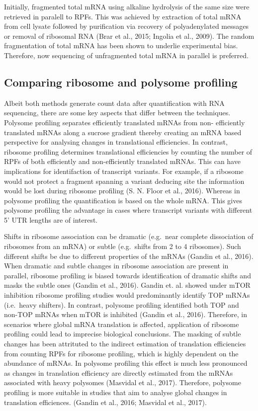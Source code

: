 \documentclass[12pt,openany]{book}
\begin{document}
Initially, fragmented total mRNA using alkaline hydrolysis of the same
size were retrieved in paralell to RPFs. This was achieved by extraction
of total mRNA from cell lysate followed by purification via recovery of
polyadenylated messages or removal of ribosomal RNA (Brar et al., 2015;
Ingolia et al., 2009). The random fragmentation of total mRNA has been
shown to underlie experimental bias. Therefore, now sequencing of
unfragmented total mRNA in parallel is preferred.

\subsection{Comparing ribosome and polysome profiling}

Albeit both methods generate count data after quantification with RNA
sequencing, there are some key aspects that differ between the
techniques. Polysome profiling separates efficiently translated mRNAs
from non- efficiently translated mRNAs along a sucrose gradient thereby
creating an mRNA based perspective for analysing changes in
translational efficiencies. In contrast, ribosome profiling determines
translational efficiencies by counting the number of RPFs of both
efficiently and non-efficiently translated mRNAs. This can have
implications for identifaction of transcript variants. For example, if a
ribosome would not protect a fragment spanning a variant deducing site
the information would be lost during ribosome profiling (S. N. Floor et
al., 2016). Whereas in polysome profiling the quantification is based on
the whole mRNA. This gives polysome profiling the advantage in cases
where transcript variants with different 5' UTR lengths are of interest.

Shifts in ribosome association can be dramatic (e.g.~near complete
dissociation of ribosomes from an mRNA) or subtle (e.g.~shifts from 2 to
4 ribosomes). Such different shifts be due to different properties of
the mRNAs (Gandin et al., 2016). When dramatic and subtle changes in
ribosome association are present in parallel, ribosome profiling is
biased towards identification of dramatic shifts and masks the subtle
ones (Gandin et al., 2016). Gandin et. al. showed under mTOR inhibition
ribosome profiling studies would predominantly identify TOP mRNAs
(i.e.~heavy shifters). In contrast, polysome profiling identified both
TOP and non-TOP mRNAs when mTOR is inhibited (Gandin et al., 2016).
Therefore, in scenarios where global mRNA translation is affected,
application of ribosome profiling could lead to imprecise biological
conclusions. The masking of subtle changes has been attrituted to the
indirect estimation of translation efficiencies from counting RPFs for
ribosome profiling, which is highly dependent on the abundance of mRNAs.
In polysome profiling this effect is much less pronounced as changes in
translation efficiency are directly estimated from the mRNAs associated
with heavy polysomes (Masvidal et al., 2017). Therefore, polysome
profiling is more suitable in studies that aim to analyse global changes
in translation efficiences. (Gandin et al., 2016; Masvidal et al.,
2017).
\end{document}
